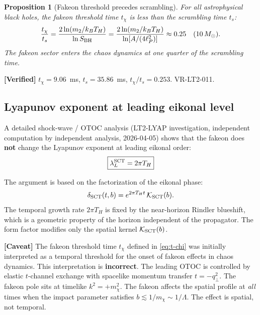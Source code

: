 \documentclass[11pt,a4paper]{article}
\theoremstyle{plain}
\newtheorem{proposition}[theorem]{Proposition}
\theoremstyle{definition}
\newcommand{\verified}[1]{%
  \par\smallskip\noindent
  \colorbox{green!10}{\parbox{\dimexpr\linewidth-2\fboxsep}{%
    \textcolor{green!50!black}{\textbf{[Verified]}} #1}}%
  \par\smallskip}
\newcommand{\caveat}[1]{%
  \par\smallskip\noindent
  \colorbox{yellow!15}{\parbox{\dimexpr\linewidth-2\fboxsep}{%
    \textcolor{orange!70!black}{\textbf{[Caveat]}} #1}}%
  \par\smallskip}
\begin{document}
\begin{proposition}[Fakeon threshold precedes scrambling]
\label{prop:t-chi}
For all astrophysical black holes, the fakeon threshold time $t_\chi$
is less than the scrambling time $t_s$:
\begin{equation}
\frac{t_\chi}{t_s} = \frac{2\ln(m_2/k_B T_H)}{\ln S_{\rm BH}}
                   = \frac{2\ln(m_2/k_B T_H)}{\ln[A/(4\ell_P^2)]}
                   \approx 0.25 \quad (10\,M_\odot).
\end{equation}
The fakeon sector enters the chaos dynamics at one quarter of the
scrambling time.
\end{proposition}

\verified{$t_\chi = 9.06$~ms, $t_s = 35.86$~ms, $t_\chi/t_s = 0.253$.
  VR-LT2-011.}

\subsection{Lyapunov exponent at leading eikonal level}

A detailed shock-wave / OTOC analysis (LT2-LYAP investigation,
independent computation by independent analysis, 2026-04-05) shows
that the fakeon does \textbf{not} change the Lyapunov exponent
at leading eikonal order:
\begin{equation}
\label{eq:lyapunov-sct}
\boxed{\lambda_L^{\rm SCT} = 2\pi T_H}
\end{equation}

The argument is based on the factorization of the eikonal phase:
\begin{equation}
\delta_{\rm SCT}(t,b) = e^{2\pi T_H t}\,\mathcal{K}_{\rm SCT}(b).
\end{equation}
The temporal growth rate $2\pi T_H$ is fixed by the near-horizon
Rindler blueshift, which is a geometric property of the horizon
independent of the propagator.  The form factor modifies only the
spatial kernel $\mathcal{K}_{\rm SCT}(b)$.

\caveat{The fakeon threshold time $t_\chi$ defined in \cref{eq:t-chi}
  was initially interpreted as a temporal threshold for the onset of
  fakeon effects in chaos dynamics.  This interpretation is
  \textbf{incorrect}.  The leading OTOC is controlled by elastic
  $t$-channel exchange with spacelike momentum transfer $t = -q_\perp^2$.
  The fakeon pole sits at timelike $k^2 = +m_\chi^2$.  The fakeon
  affects the spatial profile at \emph{all} times when the impact
  parameter satisfies $b \lesssim 1/m_\chi \sim 1/\Lambda$.
  The effect is spatial, not temporal.}
\end{document}
